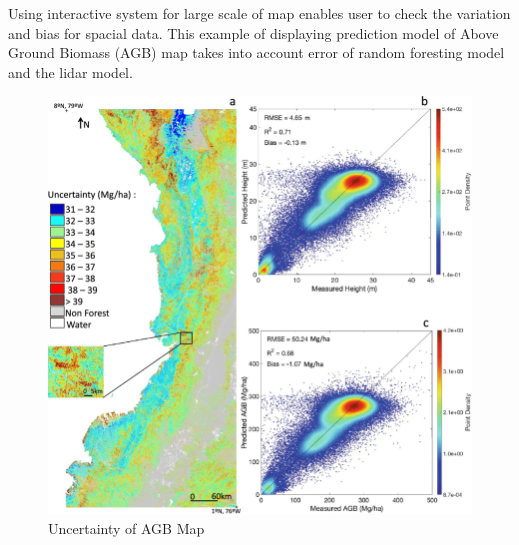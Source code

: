 \documentclass[11pt,letterpaper]{article}
\begin{document}
Using interactive system for large scale of map enables user to check the variation and bias for spacial data. This example of displaying prediction model of Above Ground Biomass (AGB) map takes into account error of random foresting model and the lidar model.

\begin{figure}
\includegraphics[width=6in]{uncertainty-1.png}
\caption{Uncertainty of AGB Map}
\centering
\end{figure}
\end{document}
